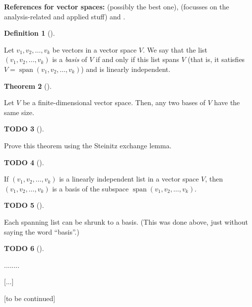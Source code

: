 \documentclass[numbers=enddot,12pt,final,onecolumn,notitlepage]{scrartcl}%
\theoremstyle{definition}
\newtheorem{theo}{Theorem}[section]
\newenvironment{theorem}[1][]
{\begin{theo}[#1]\begin{leftbar}}
{\end{leftbar}\end{theo}}
\newtheorem{defi}[theo]{Definition}
\newenvironment{definition}[1][]
{\begin{defi}[#1]\begin{leftbar}}
{\end{leftbar}\end{defi}}
\newtheorem{quest}[theo]{TODO}
\newenvironment{todo}[1][]
{\begin{quest}[#1]\begin{leftbar}}
{\end{leftbar}\end{quest}}
\begin{document}
\textbf{References for vector spaces:} \cite[\S 5.3-5.4]{LaNaSc16} (possibly
the best one), \cite[\S 2.4]{OlvSha06} (focusses on the analysis-related and
applied stuff) and \cite[Two.III]{Heffer16}.

\begin{definition}
Let $v_{1},v_{2},\ldots,v_{k}$ be vectors in a vector space $V$. We say that
the list $\left(  v_{1},v_{2},\ldots,v_{k}\right)  $ is a \textit{basis} of
$V$ if and only if this list spans $V$ (that is, it satisfies
$V=\operatorname*{span}\left(  v_{1},v_{2},\ldots,v_{k}\right)  $) and is
linearly independent.
\end{definition}

\begin{theorem}
Let $V$ be a finite-dimensional vector space. Then, any two bases of $V$ have
the same size.
\end{theorem}

\begin{todo}
Prove this theorem using the Steinitz exchange lemma.
\end{todo}



\begin{todo}
If $\left(  v_{1},v_{2},\ldots,v_{k}\right)  $ is a linearly independent list
in a vector space $V$, then $\left(  v_{1},v_{2},\ldots,v_{k}\right)  $ is a
basis of the subspace $\operatorname*{span}\left(  v_{1},v_{2},\ldots
,v_{k}\right)  $.
\end{todo}



\begin{todo}
Each spanning list can be shrunk to a basis. (This was done above, just
without saying the word \textquotedblleft basis\textquotedblright.)
\end{todo}



\begin{todo}
........
\end{todo}

[...]

[to be continued]
\end{document}
